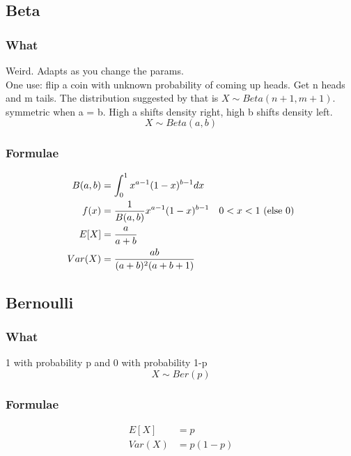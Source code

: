 \documentclass[12pt]{amsart}
\begin{document}
\subsection{Beta}
\subsubsection{What}
Weird. Adapts as you change the params.\\
One use: flip a coin with unknown probability of coming up heads. Get n heads and m tails. The distribution suggested by that is $X \sim Beta(n + 1, m + 1)$. \\
symmetric when a = b.  High a shifts density right, high b shifts density left.
\[
X \sim Beta(a,b)
\]
\subsubsection{Formulae}
\begin{align*}
B(a,b) &= \int_0^1 x^{a-1} (1-x)^{b-1} dx \\
f(x) &= {1 \over B(a,b)} x^{a-1} (1-x)^{b-1} & 0 < x < 1 \text{ (else }0)\\
E[X] &= {a \over a + b} \\
Var(X) &= {ab \over (a + b)^2 (a + b + 1)}
\end{align*}
%
\subsection{Bernoulli}
\subsubsection{What}
1 with probability p and 0 with probability 1-p
\[
X \sim Ber(p)
\]
\subsubsection{Formulae}
\begin{align*}
E[X] &= p \\
Var(X) &= p(1-p)
\end{align*}
\end{document}
